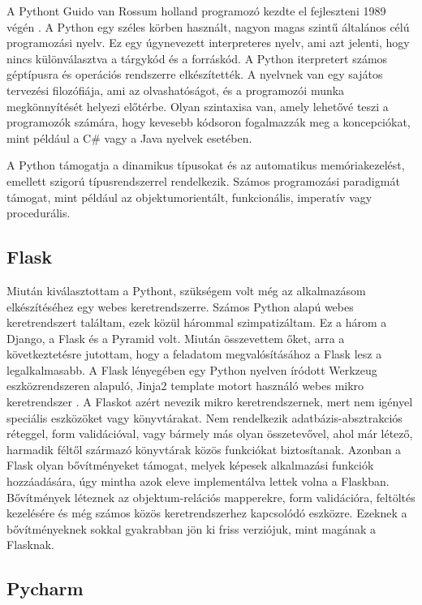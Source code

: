 A Pythont Guido van Rossum holland programozó kezdte el fejleszteni 1989 végén \cite{python}. A Python egy széles körben használt, nagyon magas szintű általános célú programozási nyelv. Ez egy úgynevezett interpreteres nyelv, ami azt jelenti, hogy nincs különválasztva a tárgykód és a forráskód. A Python iterpretert számos géptípusra és operációs rendszerre elkészítették. A nyelvnek van egy sajátos tervezési filozófiája, ami az olvashatóságot, és a programozói munka megkönnyítését helyezi előtérbe. Olyan szintaxisa van, amely lehetővé teszi a programozók számára, hogy kevesebb kódsoron fogalmazzák meg a koncepciókat, mint például a C\# vagy a Java nyelvek esetében.

A Python támogatja a dinamikus típusokat és az automatikus memóriakezelést, emellett szigorú típusrendszerrel rendelkezik. Számos programozási paradigmát támogat, mint például az objektumorientált, funkcionális, imperatív vagy procedurális.

\subsection{Flask}

Miután kiválasztottam a Pythont, szükségem volt még az alkalmazásom elkészítéséhez egy webes keretrendszerre. Számos Python alapú webes keretrendszert találtam, ezek közül hárommal szimpatizáltam. Ez a három a Django, a Flask és a Pyramid volt. Miután összevettem őket, arra a következtetésre jutottam, hogy a feladatom megvalósításához a Flask lesz a legalkalmasabb.
A Flask lényegében egy Python nyelven íródott Werkzeug eszközrendszeren alapuló, Jinja2 template motort használó webes mikro keretrendszer \cite{flask}. A Flaskot azért nevezik mikro keretrendszernek, mert nem igényel speciális eszközöket vagy könyvtárakat. Nem rendelkezik adatbázis-absztrakciós réteggel, form validációval, vagy bármely más olyan összetevővel, ahol már létező, harmadik féltől származó könyvtárak közös funkciókat biztosítanak. Azonban a Flask olyan bővítményeket támogat, melyek képesek alkalmazási funkciók hozzáadására, úgy mintha azok eleve implementálva lettek volna a Flaskban. Bővítmények léteznek az objektum-relációs mapperekre, form validációra, feltöltés kezelésére és még számos közös keretrendszerhez kapcsolódó eszközre. Ezeknek a bővítményeknek sokkal gyakrabban jön ki friss verziójuk, mint magának a Flasknak.

\subsection{Pycharm}

